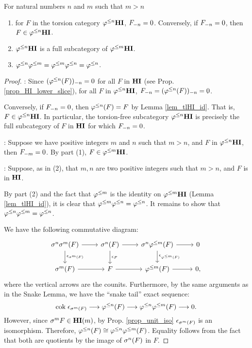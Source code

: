 \begin{prop}\label{prop_TFHI_properties}
For natural numbers $n$ and $m$ such that $m > n$

\begin{enumerate}
\item for $F$ in the torsion category $\TFHI{n}$, $\RHI[n] F = 0$. 
Conversely, if $\RHI[n] F = 0$, then $F \in \TFHI{n}$.
\tinyskip

\item $\TFHI{n}$ is a full subcategory of $\TFHI{m}$.
\tinyskip

\item $\tlHI{n}\tlHI{m} = \tlHI{m}\tlHI{n} = \tlHI{n}$.
\tinyskip
\end{enumerate}
\end{prop}
\begin{proof}
 : Since $\RHI[n]{(\tlHI{n}(F))} = 0$ for all $F$ in 
$\HI$ (see Prop. \ref{prop_HI_lower_slice}), for all $F$ in
$\TFHI{n}$, $\RHI[n]{F} = \RHI[n]{(\tlHI{n}(F))} = 0$.

Conversely, if $\RHI[n]{F} = 0$, then $\tlHI{n}(F) = F$ by Lemma
\ref{lem_tlHI_id}. That is, $F \in \TFHI{n}$. In particular, the
torsion-free subcategory $\TFHI{n}$ is precisely the full 
subcategory of $F$ in $\HI$ for which $\RHI[n]{F} = 0$.

 : Suppose we have positive integers $m$ and $n$ such
that $m > n$, and $F$ in $\TFHI{n}$, then $\RHI[m]{F} = 0$. By 
part (1), $F \in \TFHI{m}$.

 : Suppose, as in (2), that $m, n$ are two positive
integers such that $m > n$, and $F$ is in $\HI$.

By part (2) and the fact that $\tlHI{m}$ is the identity on 
$\TFHI{m}$ (Lemma \ref{lem_tlHI_id}), it is clear that 
$\tlHI{m}\tlHI{n} = \tlHI{n}$. It remains to show that 
$\tlHI{n}\tlHI{m} = \tlHI{n}$.

We have the following commutative diagram:
\[
\begin{tikzcd}
\sgHI{n}\sgHI{m}(F) \arrow{r}\arrow{d}{\cuHI_{\sgHI{m}(F)}} &
\sgHI{n}(F) \arrow{r}\arrow{d}{\cuHI_F} &
\sgHI{n}\tlHI{m}(F) \arrow{r}\arrow{d}{\cuHI_{\tlHI{m}(F)}} &
0 \\
\sgHI{m}(F) \arrow{r} &
F \arrow{r} &
\tlHI{m}(F) \arrow{r}&
0,
\end{tikzcd}
\]
where the vertical arrows are the counits. Furthermore, by the 
same arguments as in the Snake Lemma, we have the ``snake tail'' 
exact sequence:
\[
\cok \cuHI_{\sgHI{m}(F)} \to \tlHI{n}(F) \to \tlHI{n}\tlHI{m}(F) 
   \to 0.
\]
However, since $\sgHI{m}F \in \LHI[m]{\HI}$, by Prop. 
\ref{prop_unit_iso} $\cuHI_{\sgHI{m}(F)}$ is an isomorphism. 
Therefore, $\tlHI{n}(F) \cong \tlHI{n}\tlHI{m}(F)$. Equality 
follows from the fact that both are quotients by the image of 
$\sgHI{n}(F)$ in $F$.
\end{proof}

